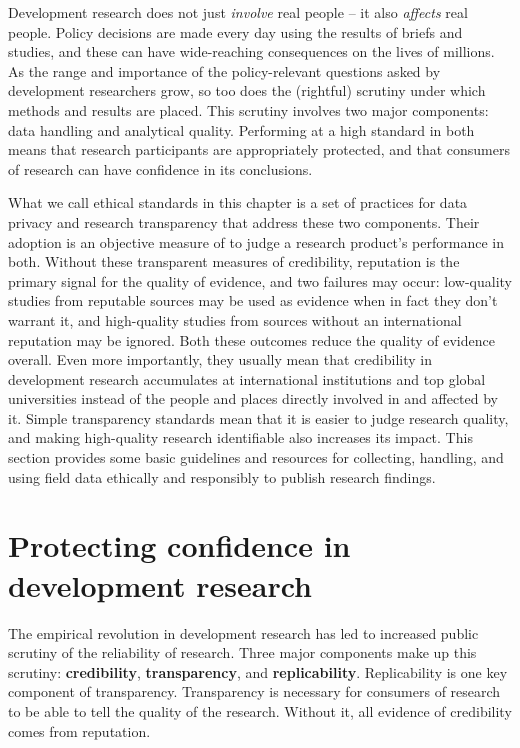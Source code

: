 
\begin{fullwidth}
Development research does not just \textit{involve} real people -- it also \textit{affects} real people.
Policy decisions are made every day using the results of briefs and studies,
and these can have wide-reaching consequences on the lives of millions.
As the range and importance of the policy-relevant questions
asked by development researchers grow,
so too does the (rightful) scrutiny under which methods and results are placed.
This scrutiny involves two major components: data handling and analytical quality.
Performing at a high standard in both means that research participants
are appropriately protected,
and that consumers of research can have confidence in its conclusions.

What we call ethical standards in this chapter is a set of practices for data privacy and research transparency that address these two components.
Their adoption is an objective measure of to judge a research product's performance in both.
Without these transparent measures of credibility, reputation is the primary signal for the quality of evidence, and two failures may occur:
low-quality studies from reputable sources may be used as evidence when in fact they don't warrant it,
and high-quality studies from sources without an international reputation may be ignored.
Both these outcomes reduce the quality of evidence overall.
Even more importantly, they usually mean that credibility in development research
accumulates at international institutions and top global universities
instead of the people and places directly involved in and affected by it.
Simple transparency standards mean that it is easier to judge research quality, and making high-quality research identifiable also increases its impact.
This section provides some basic guidelines and resources
for collecting, handling, and using field data ethically and responsibly to publish research findings.
\end{fullwidth}


\section{Protecting confidence in development research}

The empirical revolution in development research
has led to increased public scrutiny of the reliability of research.\cite{rogers_2017}
Three major components make up this scrutiny: \textbf{credibility},\cite{ioannidis2017power} \textbf{transparency},\cite{christensen2018transparency} and \textbf{replicability}.\cite{duvendack2017meant}
Replicability is one key component of transparency.
Transparency is necessary for consumers of research
to be able to tell the quality of the research.
Without it, all evidence of credibility comes from reputation.

